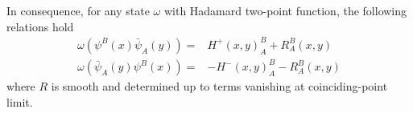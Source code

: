 %
%
In consequence, for any state $\omega$ with Hadamard two-point function, the following relations hold
\begin{equation*}
\begin{split}
\omega(\psi^B(x)\bar{\psi}_A(y)) = & H^+(x,y)^B_A + R^B_A(x,y) \\
\omega(\bar{\psi}_A(y)\psi^B(x)) = &- H^-(x,y)^B_A - R^B_A(x,y)
\end{split}
\end{equation*}
where $R$ is smooth and determined up to terms vanishing at coinciding-point limit. \\\\
%
%
%
%

